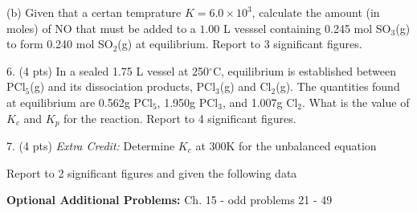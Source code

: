 \documentclass[11pt]{article}
\begin{document}
(b) Given that a certan temprature $K = 6.0\times 10^3$, calculate the amount (in moles)
of NO that must be added to a $1.00$ L vesssel containing 0.245 mol SO$_3$(g) to form
0.240 mol SO$_2$(g) at equilibrium. Report to 3 significant figures.

\pagebreak

6. (4 pts) In a sealed 1.75 L vessel at 250$^\circ$C, equilibrium is established between
PCl$_5$(g) and its dissociation products, PCl$_3$(g) and Cl$_2$(g). The quantities found
at equilibrium are 0.562g PCl$_5$, 1.950g PCl$_3$, and 1.007g Cl$_2$. What is the value of
$K_c$ and $K_p$ for the reaction. Report to 4 significant figures.
\begin{center}
\end{center}

%
%

\vspace{2in}

7. (4 pts) \textit{Extra Credit:} Determine $K_c$ at 300K for the unbalanced equation
\begin{center}
\end{center}
Report to 2 significant figures and given the following data
\begin{center}


\end{center}


\vfill
\textbf{Optional Additional Problems:} Ch. 15 - odd problems 21 - 49 
\end{document}
